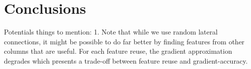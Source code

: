 \documentclass{article}
\begin{document}
\section{Conclusions} 
Potentials things to mention: 
1. Note that while we use random lateral connections, it might be possible to do far better by finding features from other columns that are useful. For each feature reuse, the gradient approximation degrades which presents a trade-off between feature reuse and gradient-accuracy. 
\end{document}
